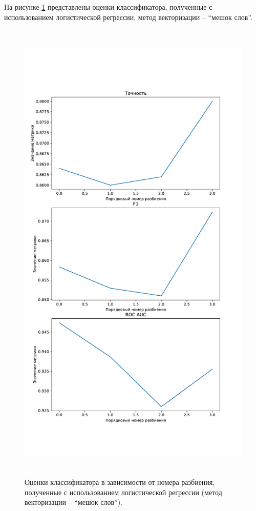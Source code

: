 На рисунке \ref{img:logicMetricsBag} представлены оценки классификатора, полученные с использованием логистической регрессии, метод векторизации -- ``мешок слов''.
\begin{figure}[H]
	\centering
	\includegraphics[height=23cm]{inc/plots/logicMetricsBag.pdf}
	\caption{ Оценки классификатора в зависимости от номера разбиения, полученные с использованием логистической регрессии (метод векторизации --  ``мешок слов''). }
	\label{img:logicMetricsBag}
\end{figure}


